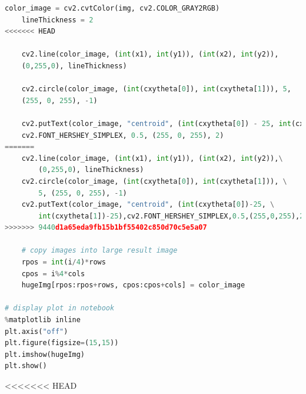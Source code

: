 \documentclass[a4paper]{report}
\begin{document}
\begin{lstlisting}[language=Python, caption=Simulation Numeric]
    color_image = cv2.cvtColor(img, cv2.COLOR_GRAY2RGB)
    lineThickness = 2
<<<<<<< HEAD
    
    cv2.line(color_image, (int(x1), int(y1)), (int(x2), int(y2)), 
    (0,255,0), lineThickness)
    
    cv2.circle(color_image, (int(cxytheta[0]), int(cxytheta[1])), 5,
    (255, 0, 255), -1)
    
    cv2.putText(color_image, "centroid", (int(cxytheta[0]) - 25, int(cxytheta[1]) - 25),
    cv2.FONT_HERSHEY_SIMPLEX, 0.5, (255, 0, 255), 2)
=======
    cv2.line(color_image, (int(x1), int(y1)), (int(x2), int(y2)),\
    	(0,255,0), lineThickness)
    cv2.circle(color_image, (int(cxytheta[0]), int(cxytheta[1])), \
    	5, (255, 0, 255), -1)
    cv2.putText(color_image, "centroid", (int(cxytheta[0])-25, \
    	int(cxytheta[1])-25),cv2.FONT_HERSHEY_SIMPLEX,0.5,(255,0,255),2)
>>>>>>> 9440d1a65eda9fb15b1bf55402c850d70c5e5a07
    
    # copy images into large result image
    rpos = int(i/4)*rows
    cpos = i%4*cols
    hugeImg[rpos:rpos+rows, cpos:cpos+cols] = color_image

# display plot in notebook
%matplotlib inline
plt.axis("off")
plt.figure(figsize=(15,15))
plt.imshow(hugeImg)
plt.show()

\end{lstlisting}

<<<<<<< HEAD
\end{document}
